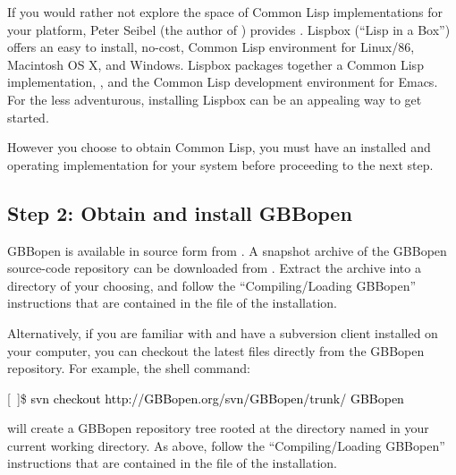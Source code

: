 \documentclass[10pt,twoside,english,pdftex]{article}
\begin{document}
If you would rather not explore the space of Common Lisp implementations for
your platform, Peter Seibel (the author of ) provides
.  Lispbox
(``Lisp in a Box'') offers an easy to install, no-cost, Common Lisp
environment for Linux/86, Macintosh OS X, and Windows.  Lispbox packages
together a Common Lisp implementation,
, and the
 Common Lisp
development environment for Emacs.  For the less adventurous, installing
Lispbox can be an appealing way to get started.

However you choose to obtain Common Lisp, you must have an installed and
operating implementation for your system before proceeding to the next step.

\subsection*{Step 2: Obtain and install GBBopen}

%
%
GBBopen is available in source form from
.  A snapshot archive of
the GBBopen source-code repository can be downloaded from
.
Extract the archive into a directory of your choosing, and follow the
``Compiling/Loading GBBopen'' instructions that are contained in the
 file of the installation.

%
%
Alternatively, if you are familiar with
 and have a subversion
client installed on your computer, you can checkout the latest files directly
from the GBBopen repository.  For example, the shell command:
%
\W\supp
\begin{example}
\textcolor{darkergray}{%
  [~]\$ \textcolor{black}{svn checkout http://GBBopen.org/svn/GBBopen/trunk/ GBBopen}}
\end{example}
%
will create a GBBopen repository tree rooted at the directory named
 in your current working directory.  As above, follow the
``Compiling/Loading GBBopen'' instructions that are contained in the
 file of the installation.
\end{document}
